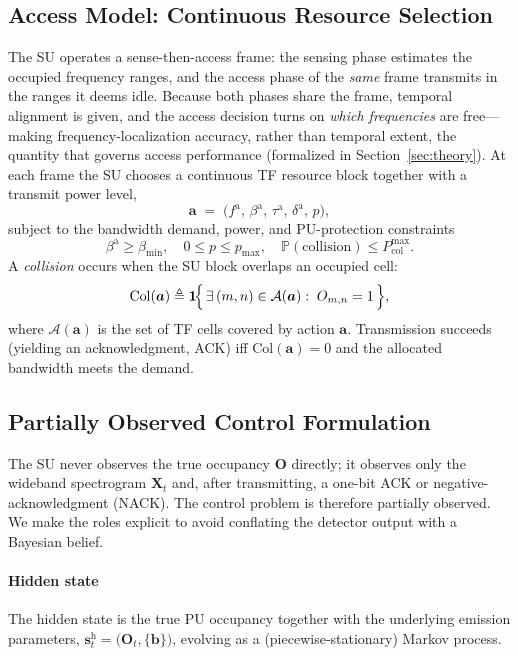 \documentclass[journal]{IEEEtran}
\newcommand{\Prob}{\mathbb{P}}
\newcommand{\Ind}{\mathbf{1}}             %
\newcommand{\defeq}{\triangleq}
\newcommand{\spec}{\bm{X}}                 %
\newcommand{\cell}{(m,n)}                  %
\newcommand{\boxk}{\bm{b}}                 %
\newcommand{\occ}{O}                       %
\newcommand{\occmap}{\bm{O}}               %
\newcommand{\act}{\bm{a}}                  %
\newcommand{\afc}{f^{\mathrm{a}}}          %
\newcommand{\aBW}{\beta^{\mathrm{a}}}      %
\newcommand{\ats}{\tau^{\mathrm{a}}}       %
\newcommand{\adur}{\delta^{\mathrm{a}}}    %
\newcommand{\pwr}{p}                       %
\newcommand{\pmax}{p_{\max}}               %
\newcommand{\dmin}{\beta_{\min}}           %
\newcommand{\Pcolmax}{P_{\mathrm{col}}^{\max}} %
\newcommand{\hidden}{\bm{s}^{\mathrm{h}}}   %
\begin{document}
\subsection{Access Model: Continuous Resource Selection}
\label{subsec:access}
The SU operates a sense-then-access frame: the sensing phase estimates the
occupied frequency ranges, and the access phase of the \emph{same} frame
transmits in the ranges it deems idle. Because both phases share the frame,
temporal alignment is given, and the access decision turns on \emph{which
frequencies} are free---making frequency-localization accuracy, rather than
temporal extent, the quantity that governs access performance (formalized in
Section~\ref{sec:theory}). At each frame the SU chooses a continuous TF
resource block together with a transmit power level,
\begin{equation}
\act \;=\; \bigl(\afc,\, \aBW,\, \ats,\, \adur,\, \pwr\bigr),
\label{eq:action}
\end{equation}
subject to the bandwidth demand, power, and PU-protection constraints
\begin{equation}
\aBW \ge \dmin, \quad 0 \le \pwr \le \pmax, \quad
\Prob(\text{collision}) \le \Pcolmax .
\label{eq:constraints}
\end{equation}
A \emph{collision} occurs when the SU block overlaps an occupied cell:
\begin{equation}
\mathrm{Col}(\act) \defeq
\Ind\!\Bigl\{\, \exists\,\cell \in \mathcal{A}(\act):\; \occ_{m,n}=1 \,\Bigr\},
\label{eq:collision}
\end{equation}
where $\mathcal{A}(\act)$ is the set of TF cells covered by action $\act$.
Transmission succeeds (yielding an acknowledgment, ACK) iff $\mathrm{Col}(\act)=0$ and the
allocated bandwidth meets the demand.

\subsection{Partially Observed Control Formulation}
\label{subsec:pomdp}
The SU never observes the true occupancy $\occmap$ directly; it observes only
the wideband spectrogram $\spec_t$ and, after transmitting, a one-bit
ACK or negative-acknowledgment (NACK). The control problem is therefore
partially observed. We make the
roles explicit to avoid conflating the detector output with a Bayesian
belief.

\paragraph*{Hidden state} The hidden state is the true PU occupancy together
with the underlying emission parameters,
$\hidden_t=\bigl(\occmap_t,\{\boxk\}\bigr)$, evolving as a
(piecewise-stationary) Markov process.
\end{document}
